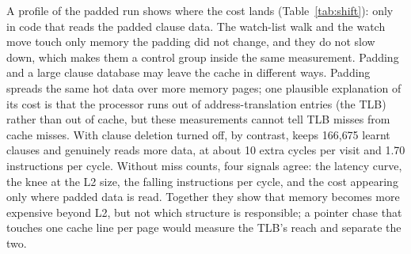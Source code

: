 A profile of the padded run shows where the cost lands
(Table~\ref{tab:shift}): only in code that reads the padded clause data. The
watch-list walk and the watch move touch only memory the padding did not
change, and they do not slow down, which makes them a control group inside the
same measurement. Padding and a large clause database may leave the cache in
different ways. Padding spreads the same hot data over more memory pages; one
plausible explanation of its cost is that the processor runs out of
address-translation entries (the TLB) rather than out of cache, but these
measurements cannot tell TLB misses from cache misses. With clause deletion
turned off, by contrast,  keeps 166{,}675 learnt clauses and
genuinely reads more data, at about 10 extra cycles per visit and 1.70
instructions per cycle. Without miss counts, four signals agree: the latency
curve, the knee at the L2 size, the falling instructions per cycle, and the
cost appearing only where padded data is read. Together they show that memory
becomes more expensive beyond L2, but not which structure is responsible; a
pointer chase that touches one cache line per page would measure the TLB's
reach and separate the two.
